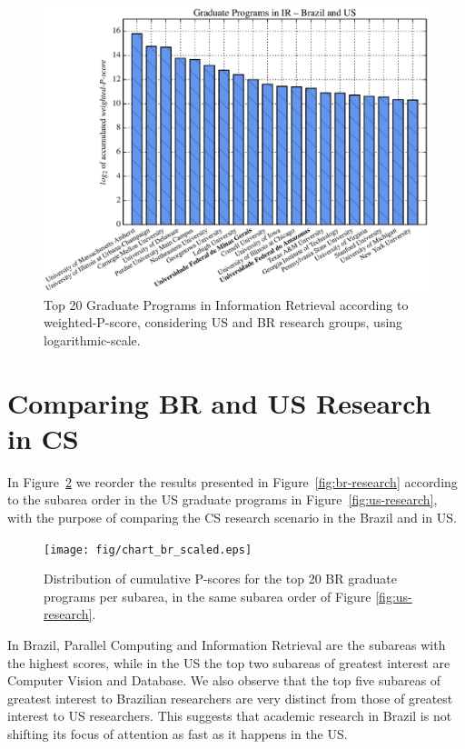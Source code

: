 \documentclass[msc]{ppgccufmg}
\begin{document}
\begin{figure}[htbp]
 	\includegraphics[width=\linewidth]{fig/ir_groups.eps}
    \caption{Top 20 Graduate Programs in Information Retrieval according to weighted-P-score, considering US and BR research groups, using logarithmic-scale.}
    \label{fig:ranking-ir}
\end{figure}

\section{Comparing BR and US Research in CS}\label{sec:comparison}

In Figure~\ref{fig:br-research-us-order} we reorder the results presented in Figure~\ref{fig:br-research} according to the subarea order in the US graduate programs in Figure~\ref{fig:us-research}, with the purpose of comparing the CS research scenario in the Brazil and in US.

\begin{figure}[tb]
    \centering
    \texttt{[image: fig/chart\_br\_scaled.eps]}
    \caption{Distribution of cumulative P-scores for the top 20 BR graduate programs per subarea, in the same subarea order of Figure \ref{fig:us-research}.}
    \label{fig:br-research-us-order}
\end{figure}

In Brazil, Parallel Computing and Information Retrieval are the subareas with the highest scores, while in the US the top two subareas of greatest interest are Computer Vision and Database. 
%
We also observe that the top five subareas of greatest interest to Brazilian researchers are very distinct from those of greatest interest to US researchers. This suggests that academic research in Brazil is not shifting its focus of attention as fast as it happens in the US.
\end{document}
